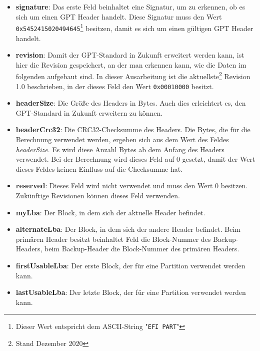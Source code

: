 \newpage
\begin{itemize}
    \item \textbf{signature}: 
    Das erste Feld beinhaltet eine Signatur, um zu erkennen, ob es sich um einen GPT Header handelt.
    Diese Signatur muss den Wert \texttt{0x5452415020494645}\footnote{
        Dieser Wert entspricht dem ASCII-String "\texttt{EFI PART}"
    } 
    besitzen, damit es sich um einen gültigen GPT Header handelt.

    \item \textbf{revision}:
    Damit der GPT-Standard in Zukunft erweitert werden kann, ist hier die Revision gespeichert, an der man erkennen kann, wie die Daten im folgenden aufgebaut sind.
    In dieser Ausarbeitung ist die aktuellste\footnote{
        Stand Dezember 2020
    }
    Revision 1.0 beschrieben, in der dieses Feld den Wert \texttt{0x00010000} besitzt.

    \item \textbf{headerSize}:
    Die Größe des Headers in Bytes.
    Auch dies erleichtert es, den GPT-Standard in Zukunft erweitern zu können.

    \item \textbf{headerCrc32}:
    Die CRC32-Checksumme des Headers.
    Die Bytes, die für die Berechnung verwendet werden, ergeben sich aus dem Wert des Feldes \textit{headerSize}.
    Es wird diese Anzahl Bytes ab dem Anfang des Headers verwendet.
    Bei der Berechnung wird dieses Feld auf 0 gesetzt, damit der Wert dieses Feldes keinen Einfluss auf die Checksumme hat.

    \item \textbf{reserved}:
    Dieses Feld wird nicht verwendet und muss den Wert 0 besitzen. Zukünftige Revisionen können dieses Feld verwenden.

    \item \textbf{myLba}:
    Der Block, in dem sich der aktuelle Header befindet.

    \item \textbf{alternateLba}:
    Der Block, in dem sich der andere Header befindet.
    Beim primären Header besitzt beinhaltet Feld die Block-Nummer des Backup-Headers, beim Backup-Header die Block-Nummer des primären Headers.

    \item \textbf{firstUsableLba}:
    Der erste Block, der für eine Partition verwendet werden kann.

    \item \textbf{lastUsableLba}:
    Der letzte Block, der für eine Partition verwendet werden kann.


\end{itemize}
